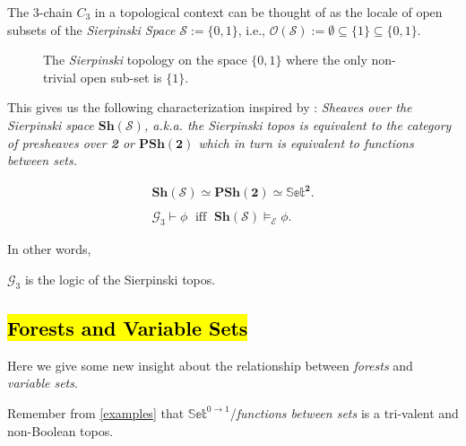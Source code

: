  \begin{remark} 
The 3-chain $C_3$ in a topological context can be thought of as the locale of open subsets of the \emph{Sierpinski Space} $\mathcal{S}:=\{0,1\}$, i.e., $\mathcal{O(S)}:= \emptyset \subseteq \{1\} \subseteq \{0,1\}$.
 \begin{figure}[h]
 	\centering
 	\caption{The \emph{Sierpinski} topology on the space $\{0,1\}$ where the only non-trivial open sub-set is $\{1\}$. }
 \end{figure}
\end{remark}
\newpage
 This gives us the following characterization inspired by \cite{elephant}:
 \newline
\emph{Sheaves over the Sierpinski space $\textbf{Sh}(\mathcal{S})$, a.k.a. the \emph{Sierpinski topos} is equivalent to the category of presheaves over \textbf{2} or $\textbf{PSh}(\textbf{2})$ which in turn is equivalent to \emph{functions between sets.}}
\begin{prop}	
	\begin{gather*}
		\textbf{Sh}(\mathcal{S}) \simeq \textbf{PSh}(\textbf{2}) \simeq \mathbb{Set}^{\textbf{2}}. \\ \\
		\mathcal{G}_{3} \vdash \phi \;\text{ iff }\;\mathbf{Sh}(\mathcal{S}) \models_{\mathcal{E}} \phi.
	\end{gather*}
\end{prop}
  In other words, 
  \begin{prop}
  	$\mathcal{G}_3$  is the logic of the Sierpinski topos.
  \end{prop}
  
  
 
 
 \newpage
 \subsection{\hl{Forests and Variable Sets}}
\label{forestsvar}
 Here we give some new insight about the relationship between \emph{forests} and \emph{variable sets}.  
\newline
 
 Remember from \ref{examples} that $\mathbb{Set}^{0 \rightarrow 1}$/\emph{functions between sets} is a tri-valent and non-Boolean topos. 
 \newline
 

